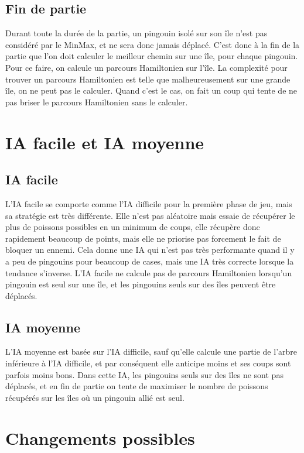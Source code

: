 \documentclass{report}
\begin{document}
\section{Fin de partie}
Durant toute la durée de la partie, un pingouin isolé sur son île n'est pas considéré par le MinMax, et ne sera donc jamais déplacé.
C'est donc à la fin de la partie que l'on doit calculer le meilleur chemin sur une île, pour chaque pingouin.
\newline 
Pour ce faire, on calcule un parcours Hamiltonien sur l'île. La complexité pour trouver un parcours Hamiltonien est telle que malheureusement sur une grande île, on ne peut pas le calculer. Quand c'est le cas, on fait un coup qui tente de ne pas briser le parcours Hamiltonien sans le calculer.

\chapter{IA facile et IA moyenne}
\section{IA facile}
L'IA facile se comporte comme l'IA difficile pour la première phase de jeu, mais sa stratégie est très différente. Elle n'est pas aléatoire mais essaie de récupérer le plus de poissons possibles en un minimum de coups, elle récupère donc rapidement beaucoup de points, mais elle ne priorise pas forcement le fait de bloquer un ennemi.
Cela donne une IA qui n'est pas très performante quand il y a peu de pingouins pour beaucoup de cases, mais une IA très correcte lorsque la tendance s'inverse.
\newline
L'IA facile ne calcule pas de parcours Hamiltonien lorsqu'un pingouin est seul sur une île, et les pingouins seuls sur des îles peuvent être  déplacés. 

\section{IA moyenne}
L'IA moyenne est basée sur l'IA difficile, sauf qu'elle calcule une partie de l'arbre inférieure à l'IA difficile, et par conséquent elle anticipe moins et ses coups sont parfois moins bons.
Dans cette IA, les pingouins seuls sur des îles ne sont pas déplacés, et en fin de partie on tente de maximiser le nombre de poissons récupérés sur les îles où un pingouin allié est seul.


\chapter{Changements possibles}
\end{document}
